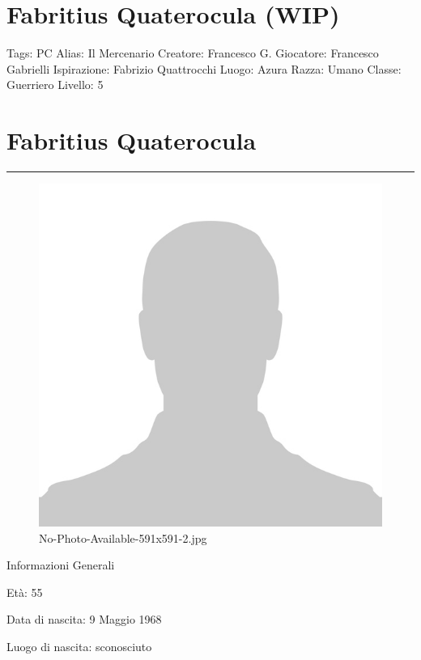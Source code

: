 \section{Fabritius Quaterocula (WIP)}\label{fabritius-quaterocula-wip}

Tags: PC Alias: Il Mercenario Creatore: Francesco G. Giocatore:
Francesco Gabrielli Ispirazione: Fabrizio Quattrocchi Luogo: Azura
Razza: Umano Classe: Guerriero Livello: 5

\section{Fabritius Quaterocula}\label{fabritius-quaterocula}

\begin{center}\rule{0.5\linewidth}{0.5pt}\end{center}

\begin{figure}
\centering
\includegraphics{No-Photo-Available-591x591-2.jpg}
\caption{No-Photo-Available-591x591-2.jpg}
\end{figure}

Informazioni Generali

Età: 55

Data di nascita: 9 Maggio 1968

Luogo di nascita: sconosciuto

